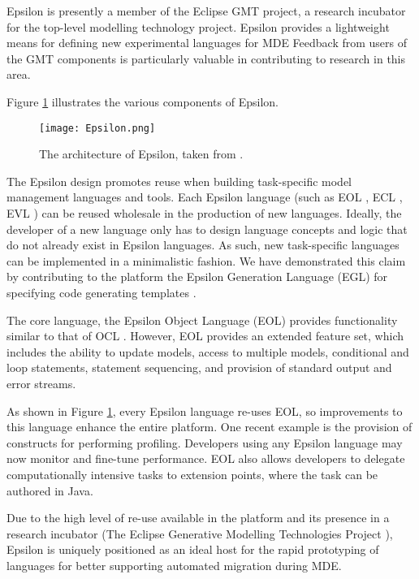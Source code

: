 Epsilon is presently a member of the Eclipse GMT \cite{gmt} project, a research incubator for the top-level modelling technology project. Epsilon provides a lightweight means for defining new experimental languages for MDE Feedback from users of the GMT components is particularly valuable in contributing to research in this area.

Figure \ref{fig:epsilon} illustrates the various components of Epsilon.

\begin{figure}[htbp]
  \begin{center}
    \leavevmode
    \texttt{[image: Epsilon.png]}
  \end{center}
  \caption{The architecture of Epsilon, taken from \cite{rose08egl}.}
  \label{fig:epsilon}
\end{figure}

The Epsilon design promotes reuse when building task-specific model management languages and tools.  Each Epsilon language (such as EOL \cite{kolovos06eol}, ECL \cite{kolovos06ecl}, EVL \cite{kolovos08evl}) can be reused wholesale in the production of new languages. Ideally, the developer of a new language only has to design language concepts and logic that do not already exist in Epsilon languages. As such, new task-specific languages can be implemented in a minimalistic fashion. We have demonstrated this claim by contributing to the platform the Epsilon Generation Language (EGL) for specifying code generating templates \cite{rose08egl}.

The core language, the Epsilon Object Language (EOL) \cite{kolovos06eol} provides functionality similar to that of OCL \cite{ocl2}. However, EOL provides an extended feature set, which includes the ability to update models, access to multiple models, conditional and loop statements, statement sequencing, and provision of standard output and error streams.

As shown in Figure \ref{fig:epsilon}, every Epsilon language re-uses EOL, so improvements to this language enhance the entire platform. One recent example is the provision of constructs for performing profiling. Developers using any Epsilon language may now monitor and fine-tune performance. EOL also allows developers to delegate computationally intensive tasks to extension points, where the task can be authored in Java.

Due to the high level of re-use available in the platform and its presence in a research incubator (The Eclipse Generative Modelling Technologies Project \cite{gmt}), Epsilon is uniquely positioned as an ideal host for the rapid prototyping of languages for better supporting automated migration during MDE.